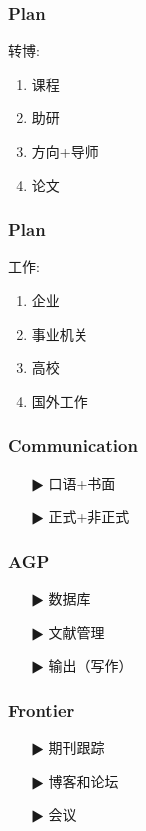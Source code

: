 \documentclass[11pt,mathserif]{beamer} %
\begin{document}
\begin{frame}
  \frametitle{Plan}
  \begin{block}{转博:}
    \begin{enumerate}
    	\item 课程
    	\item 助研
    	\item 方向+导师
    	\item 论文
    \end{enumerate}
  \end{block}
\end{frame}

\begin{frame}
  \frametitle{Plan}
  \begin{block}{工作:}
    \begin{enumerate}
    	\item 企业
    	\item 事业机关
    	\item 高校
    	\item 国外工作
    \end{enumerate}
  \end{block}
\end{frame}


\begin{frame}
  \frametitle{Communication}
  \begin{itemize}
    \item[$\RHD$] 口语+书面
    \item[$\RHD$] 正式+非正式
  \end{itemize}
\end{frame}

\begin{frame}
  \frametitle{AGP}
  \begin{itemize}
    \item[$\RHD$] 数据库
    \item[$\RHD$] 文献管理
    \item[$\RHD$] 输出（写作）
  \end{itemize}
\end{frame}


\begin{frame}
  \frametitle{Frontier}
  \begin{itemize}
    \item[$\RHD$] 期刊跟踪
    \item[$\RHD$] 博客和论坛
    \item[$\RHD$] 会议
  \end{itemize}
\end{frame}
\end{document}

